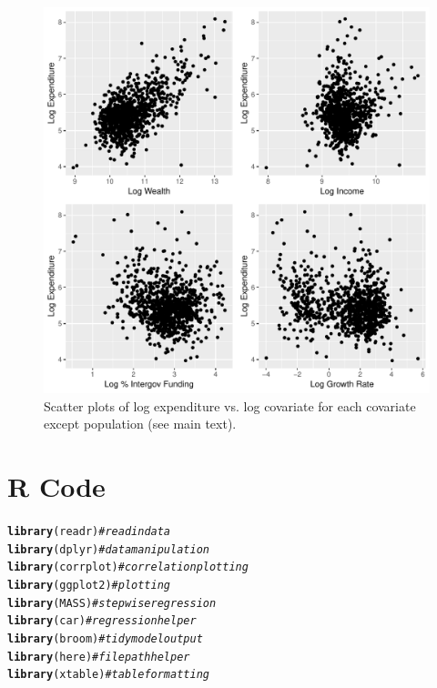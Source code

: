 \documentclass{article}\usepackage[]{graphicx}\usepackage[]{color}
\makeatletter
\def\maxwidth{ %
  \ifdim\Gin@nat@width>\linewidth
    \linewidth
  \else
    \Gin@nat@width
  \fi
}
\newcommand{\hlcom}[1]{\textcolor[rgb]{0.678,0.584,0.686}{\textit{#1}}}%
\newcommand{\hlstd}[1]{\textcolor[rgb]{0.345,0.345,0.345}{#1}}%
\newcommand{\hlkwd}[1]{\textcolor[rgb]{0.737,0.353,0.396}{\textbf{#1}}}%
\newenvironment{kframe}{%
 \def\at@end@of@kframe{}%
 \ifinner\ifhmode%
  \def\at@end@of@kframe{\end{minipage}}%
  \begin{minipage}{\columnwidth}%
 \fi\fi%
 \def\FrameCommand##1{\hskip\@totalleftmargin \hskip-\fboxsep
 \colorbox{shadecolor}{##1}\hskip-\fboxsep
     \hskip-\linewidth \hskip-\@totalleftmargin \hskip\columnwidth}%
 \MakeFramed {\advance\hsize-\width
   \@totalleftmargin\z@ \linewidth\hsize
   \@setminipage}}%
 {\par\unskip\endMakeFramed%
 \at@end@of@kframe}
\newenvironment{knitrout}{}{} %
\makeatother
\begin{document}
\begin{appendices}
\begin{knitrout}
\color{fgcolor}\begin{figure}
\includegraphics[width=\maxwidth]{figure/r_append_scatter-1} \caption[Scatter plots of log expenditure vs]{Scatter plots of log expenditure vs. log covariate for each covariate except population (see main text).}\label{fig:r append_scatter}
\end{figure}


\end{knitrout}


\newpage
\section{R Code}
\begin{knitrout}
\color{fgcolor}\begin{kframe}
\begin{alltt}
\hlkwd{library}\hlstd{(readr)} \hlcom{# read in data}
\hlkwd{library}\hlstd{(dplyr)} \hlcom{# data manipulation}
\hlkwd{library}\hlstd{(corrplot)} \hlcom{# correlation plotting}
\hlkwd{library}\hlstd{(ggplot2)} \hlcom{# plotting}
\hlkwd{library}\hlstd{(MASS)} \hlcom{# stepwise regression}
\hlkwd{library}\hlstd{(car)} \hlcom{# regression helper}
\hlkwd{library}\hlstd{(broom)} \hlcom{# tidy model output}
\hlkwd{library}\hlstd{(here)} \hlcom{# file path helper}
\hlkwd{library}\hlstd{(xtable)} \hlcom{# table formatting}


\end{alltt}
\end{kframe}
\end{knitrout}
\end{appendices}
\end{document}
